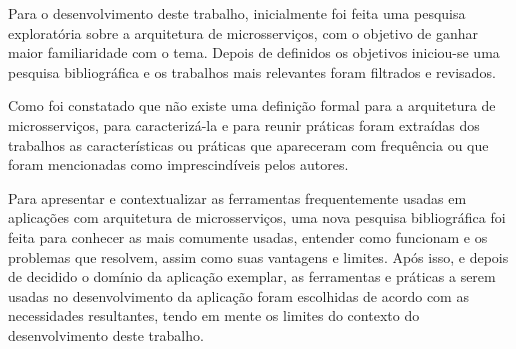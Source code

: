 Para o desenvolvimento deste trabalho, inicialmente foi feita uma pesquisa exploratória sobre a arquitetura de microsserviços, com o objetivo de ganhar maior familiaridade com o tema. Depois de definidos os objetivos iniciou-se uma pesquisa bibliográfica e os trabalhos mais relevantes foram filtrados e revisados. 

Como foi constatado que não existe uma definição formal para a arquitetura de microsserviços, para caracterizá-la e para reunir práticas foram extraídas dos trabalhos as características ou práticas que apareceram com frequência ou que foram mencionadas como imprescindíveis pelos autores. 

Para apresentar e contextualizar as ferramentas frequentemente usadas em aplicações com arquitetura de microsserviços, uma nova pesquisa bibliográfica foi feita para conhecer as mais comumente usadas, entender como funcionam e os problemas que resolvem, assim como suas vantagens e limites. Após isso, e depois de decidido o domínio da aplicação exemplar, as ferramentas e práticas a serem usadas no desenvolvimento da aplicação foram escolhidas de acordo com as necessidades resultantes, tendo em mente os limites do contexto do desenvolvimento deste trabalho. 
 


